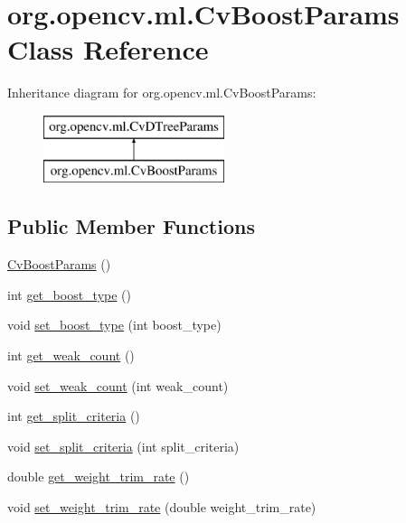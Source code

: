 \hypertarget{classorg_1_1opencv_1_1ml_1_1_cv_boost_params}{}\section{org.\+opencv.\+ml.\+Cv\+Boost\+Params Class Reference}
\label{classorg_1_1opencv_1_1ml_1_1_cv_boost_params}
Inheritance diagram for org.\+opencv.\+ml.\+Cv\+Boost\+Params\+:\begin{figure}[H]
\begin{center}
\leavevmode
\includegraphics[height=2.000000cm]{classorg_1_1opencv_1_1ml_1_1_cv_boost_params}
\end{center}
\end{figure}
\subsection*{Public Member Functions}
\begin{DoxyCompactItemize}
\item 
\mbox{\hyperlink{classorg_1_1opencv_1_1ml_1_1_cv_boost_params_a5b9287c0c9f817592786a0b8009eea76}{Cv\+Boost\+Params}} ()
\item 
int \mbox{\hyperlink{classorg_1_1opencv_1_1ml_1_1_cv_boost_params_a42cf91885cadf7cc46a8b7bab8f8cadb}{get\+\_\+boost\+\_\+type}} ()
\item 
void \mbox{\hyperlink{classorg_1_1opencv_1_1ml_1_1_cv_boost_params_a937fc03c131ecd8e320fa93542a28485}{set\+\_\+boost\+\_\+type}} (int boost\+\_\+type)
\item 
int \mbox{\hyperlink{classorg_1_1opencv_1_1ml_1_1_cv_boost_params_a770c2b53bf754b1d1c8230222e1275c5}{get\+\_\+weak\+\_\+count}} ()
\item 
void \mbox{\hyperlink{classorg_1_1opencv_1_1ml_1_1_cv_boost_params_a09656aa079fe2a0136a7bbf120c7b123}{set\+\_\+weak\+\_\+count}} (int weak\+\_\+count)
\item 
int \mbox{\hyperlink{classorg_1_1opencv_1_1ml_1_1_cv_boost_params_af971d81de247e9001a8f3742ac18b681}{get\+\_\+split\+\_\+criteria}} ()
\item 
void \mbox{\hyperlink{classorg_1_1opencv_1_1ml_1_1_cv_boost_params_ad16866ac93f1425212f9232ebe11ad2f}{set\+\_\+split\+\_\+criteria}} (int split\+\_\+criteria)
\item 
double \mbox{\hyperlink{classorg_1_1opencv_1_1ml_1_1_cv_boost_params_a853036840d0b8a91b532c0a1a37448a5}{get\+\_\+weight\+\_\+trim\+\_\+rate}} ()
\item 
void \mbox{\hyperlink{classorg_1_1opencv_1_1ml_1_1_cv_boost_params_ac60d9279920a94d18301aa0cf9a6e8cc}{set\+\_\+weight\+\_\+trim\+\_\+rate}} (double weight\+\_\+trim\+\_\+rate)
\end{DoxyCompactItemize}
